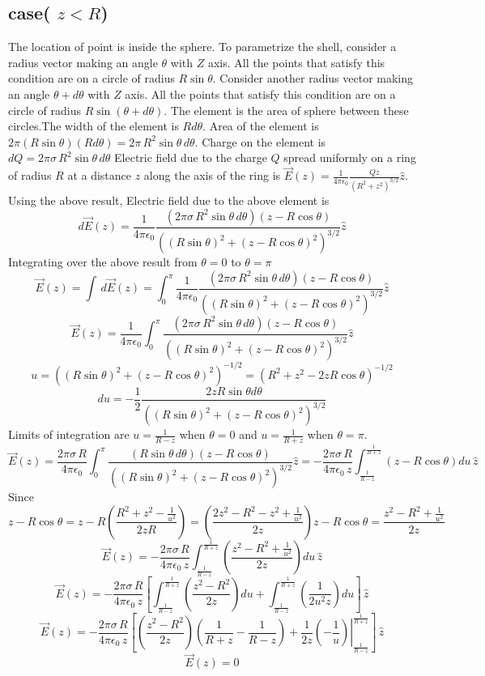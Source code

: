 \subsection*{case( $z<R$)}
The location of point is inside the sphere.
To parametrize the shell, consider a radius vector making an angle $\theta$ with $Z$ axis. All the points that satisfy this condition are on a circle of radius $R\sin{\theta}$. Consider another radius vector making an angle $\theta+d\theta$ with $Z$ axis. All the points that satisfy this condition are on a circle of radius $R\sin{(\theta+d\theta)} $. The element is the area of sphere between these circles.The width of the element is $Rd\theta$. Area of the element is $2\pi(R\sin{\theta})(Rd\theta)=2\pi\,R^2\sin{\theta}\,d\theta$. Charge on the element is $dQ=2\pi\sigma\,R^2\sin{\theta}\,d\theta$
Electric field due to the charge $Q$ spread uniformly on a ring of radius $R$ at a distance $z$ along the axis of the ring is $\vec{E}(z)=\frac{1}{4\pi\epsilon_0}\frac{Qz}{(R^2+z^2)^{3/2}}\hat{z}$.
Using the above result,
Electric field due to the above element is $$d\vec{E}(z)=\frac{1}{4\pi\epsilon_0}\frac{(2\pi\sigma\,R^2\sin{\theta}\,d\theta)(z-R\cos{\theta})}{((R\sin{\theta})^2+(z-R\cos{\theta})^2)^{3/2}}\hat{z}$$
Integrating over the above result from $\theta=0$ to $\theta=\pi$
$$\vec{E}(z)=\int\,d\vec{E}(z)=\int_{0}^{\pi}\frac{1}{4\pi\epsilon_0}\frac{(2\pi\sigma\,R^2\sin{\theta}\,d\theta)(z-R\cos{\theta})}{((R\sin{\theta})^2+(z-R\cos{\theta})^2)^{3/2}}\hat{z}$$
$$\vec{E}(z)=\frac{1}{4\pi\epsilon_0}\int_{0}^{\pi}\frac{(2\pi\sigma\,R^2\sin{\theta}\,d\theta)(z-R\cos{\theta})}{((R\sin{\theta})^2+(z-R\cos{\theta})^2)^{3/2}}\hat{z}$$
$$u=((R\sin{\theta})^2+(z-R\cos{\theta})^2)^{-1/2}=(R^2+z^2-2zR\cos{\theta})^{-1/2}$$
$$du=-\frac{1}{2}\frac{2zR\sin{\theta}d{\theta}}{((R\sin{\theta})^2+(z-R\cos{\theta})^2)^{3/2}}$$
Limits of integration are $u=\frac{1}{R-z}$ when $\theta=0$ and $u=\frac{1}{R+z}$ when $\theta=\pi$.
$$\vec{E}(z)=\frac{2\pi\sigma\,R}{4\pi\epsilon_0}\int_{0}^{\pi}\frac{(R\sin{\theta}\,d\theta)(z-R\cos{\theta})}{((R\sin{\theta})^2+(z-R\cos{\theta})^2)^{3/2}}\hat{z}=-\frac{2\pi\sigma\,R}{4\pi\epsilon_0\,z}\int_{\frac{1}{R-z}}^{\frac{1}{R+z}}(z-R\cos{\theta})du\,\hat{z}$$
Since $$z-R\cos{\theta}=z-R\left(\frac{R^2+z^2-\frac{1}{u^2}}{2zR} \right )=\left(\frac{2z^2-R^2-z^2+\frac{1}{u^2}}{2z} \right )z-R\cos{\theta}=\frac{z^2-R^2+\frac{1}{u^2}}{2z}$$
$$\vec{E}(z)=-\frac{2\pi\sigma\,R}{4\pi\epsilon_0\,z}\int_{\frac{1}{R-z}}^{\frac{1}{R+z}}\left(\frac{z^2-R^2+\frac{1}{u^2}}{2z} \right )du\,\hat{z}$$
$$\vec{E}(z)=-\frac{2\pi\sigma\,R}{4\pi\epsilon_0\,z}\left[\int_{\frac{1}{R-z}}^{\frac{1}{R+z}}\left(\frac{z^2-R^2}{2z} \right )du+\int_{\frac{1}{R-z}}^{\frac{1}{R+z}}\left(\frac{1}{2u^2z} \right )du\right ]\,\hat{z}$$
$$\vec{E}(z)=-\frac{2\pi\sigma\,R}{4\pi\epsilon_0\,z}\left[\left(\frac{z^2-R^2}{2z} \right )\left(\frac{1}{R+z}-\frac{1}{R-z} \right )+\frac{1}{2z}\left.\left(-\frac{1}{u} \right )\right|_{\frac{1}{R-z}}^{\frac{1}{R+z}}\right ]\,\hat{z}$$
$$\vec{E}(z)=0$$

